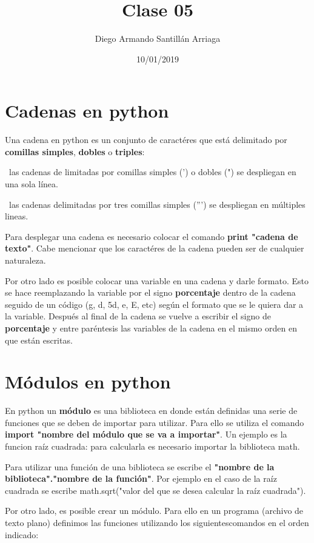 \documentclass[letter paper, 12pt, oneside]{article}
\title{\Huge Clase 05}
\author{Diego Armando Santillán Arriaga}
\date{10/01/2019}
\begin{document}
	\maketitle
\newpage
\section{Cadenas  en python}


Una cadena en python es un conjunto de caractéres que está delimitado por \textbf{comillas simples}, \textbf{dobles} o \textbf{triples}:


~las cadenas de limitadas por comillas simples (') o dobles (") se despliegan en una sola línea. 


~las cadenas delimitadas por tres comillas simples (''') se despliegan en múltiples lineas. 


Para desplegar una cadena es necesario colocar el comando \textbf{print "cadena de texto"}. Cabe mencionar que los caractéres de la cadena pueden ser de cualquier naturaleza. 


Por otro lado es posible colocar una variable en una cadena y darle formato. Esto se hace reemplazando la variable por el signo \textbf{porcentaje} dentro de la cadena seguido de un código (g, d, 5d, e, E, etc) según el formato que se le quiera dar a la variable. Después al final de la cadena se vuelve a escribir el signo de \textbf{porcentaje} y entre paréntesis las variables de la cadena en el mismo orden en que están escritas. 



\section{Módulos en python}
	

En python un \textbf{módulo} es una biblioteca en donde están definidas una serie de funciones que se deben de importar para utilizar. Para ello se utiliza el comando \textbf{import "nombre del módulo que se va a importar"}. Un ejemplo es la funcion raíz cuadrada: para calcularla es necesario importar la biblioteca math. 

Para utilizar una función de una biblioteca se escribe el \textbf{"nombre de la biblioteca"."nombre de la función"}. Por ejemplo en el caso de la raíz cuadrada se escribe math.sqrt("valor del que se desea calcular la raíz cuadrada").


Por otro lado, es posible crear un módulo. Para ello en un programa (archivo de texto plano) definimos las funciones utilizando los siguientescomandos en el orden indicado:
\end{document}
